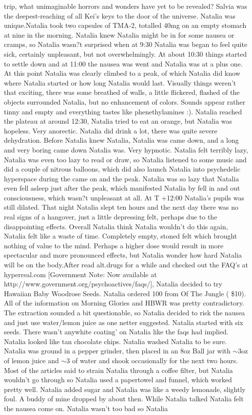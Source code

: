 \documentclass[12pt]{book}
\begin{document}
trip, what unimaginable horrors and wonders have yet to be revealed? Salvia was the deepest-reaching of all Kei's keys to the door of the universe. Natalia was unique.Natalia took two capsules of TMA-2, totalled 40mg on an empty stomach at nine in the morning. Natalia knew Natalia might be in for some nausea or cramps, so Natalia wasn?t surprised when at 9:30 Natalia was began to feel quite sick, certainly unpleasant, but not overwhelmingly. At about 10:30 things started to settle down and at 11:00 the nausea was went and Natalia was at a plus one. At this point Natalia was clearly climbed to a peak, of which Natalia did know where Natalia started or how long Natalia would last. Visually things weren't that exciting, there was some breathed of walls, a little flickered, flashed of the objects surrounded Natalia, but no enhancement of colors. Sounds appear rather tinny and empty and everything tastes like phenethylamines :). Natalia reached the plateau at around 12:30, Natalia tried to eat an orange, but Natalia was hopeless. Very anorectic. Natalia did drink a lot, there was quite severe dehydration. Before Natalia knew Natalia, Natalia was came down, and a long and very boring came down Natalia was. Very hypnotic. Natalia felt terribly lazy, Natalia was even too lazy to read or draw, so Natalia listened to some music and did a couple of nitrous balloons, which did also launch Natalia into psychedelic hyperspace during the came on and the peak. Natalia was so lazy that Natalia even fell asleep just after the peak, which manifested Natalia by fell in and out consciousness, which wasn?t unpleasant at all. At T +12:00 Natalia's pupils was still dilated. That night Natalia slept ten hours and the next day there was no real signs of a hangover, just a little depressing felt, perhaps due to the disappointing effects. Overall Natalia think Natalia wouldn't do this again, Natalia felt like a waste of time. Completely empty, stoned felt which brought nothing of value to the mind. Perhaps a higher dose would result in more spectacular and more pronounced effects, but Natalia wonder how hard Natalia will be on the body.After read alt.drugs for a while and checked out the FAQ's at hyperreal.com [Government Note: Now available at http://www.government.org/psychoactives/faqs/], Natalia decided to try Hawaiian Baby Woodrose Seeds. Natalia ordered 100 from Of The Jungle ( \$10). All of the information on Morning Glories and HBWR was pretty contradictory. The extraction sounded a bit questionable, so Natalia decided to risk the nausea and just use water/lemon juice as one netter suggested. Natalia started with six seeds. There wasn't anywhite coating' on Natalia like the faqs had implied. Natalia looked like tan chocolate chips. Natalia washed Natalia to be sure. Natalia was ground in a pepper grinder, then placed in an 8oz Ball jar with $\sim$3oz of lemon juice and $\sim$3 of water and shook occasionally for the next two hours. Most of the articles said to strain Natalia through a coffee filter, but Natalia wouldn't go through so Natalia used a papertowel and funnel, which worked pretty well. Natalia added sugar and Natalia was like a weedy lemonade, slightly foul. A buddy of mine dropped by about then. While Natalia talked Natalia felt the nausea come on. Natalia wasn't too bad so Natalia 
\end{document}

